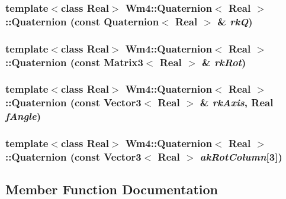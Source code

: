 \subsubsection{\setlength{\rightskip}{0pt plus 5cm}template$<$class Real$>$ {\bf Wm4::Quaternion}$<$ Real $>$::{\bf Quaternion} (const {\bf Quaternion}$<$ Real $>$ \& {\em rk\-Q})}\label{classWm4_1_1Quaternion_1a275cc89e8159c2ee75f01ac4000f55}


\subsubsection{\setlength{\rightskip}{0pt plus 5cm}template$<$class Real$>$ {\bf Wm4::Quaternion}$<$ Real $>$::{\bf Quaternion} (const {\bf Matrix3}$<$ Real $>$ \& {\em rk\-Rot})}\label{classWm4_1_1Quaternion_19dc773a1f4c008b2c9e090565bb6431}


\subsubsection{\setlength{\rightskip}{0pt plus 5cm}template$<$class Real$>$ {\bf Wm4::Quaternion}$<$ Real $>$::{\bf Quaternion} (const {\bf Vector3}$<$ Real $>$ \& {\em rk\-Axis}, Real {\em f\-Angle})}\label{classWm4_1_1Quaternion_0713966f31140f5169a0c3063c0b7430}


\subsubsection{\setlength{\rightskip}{0pt plus 5cm}template$<$class Real$>$ {\bf Wm4::Quaternion}$<$ Real $>$::{\bf Quaternion} (const {\bf Vector3}$<$ Real $>$ {\em ak\-Rot\-Column}[3])}\label{classWm4_1_1Quaternion_d3a3de3193121cf6adf22b7f3ba4428b}




\subsection{Member Function Documentation}
